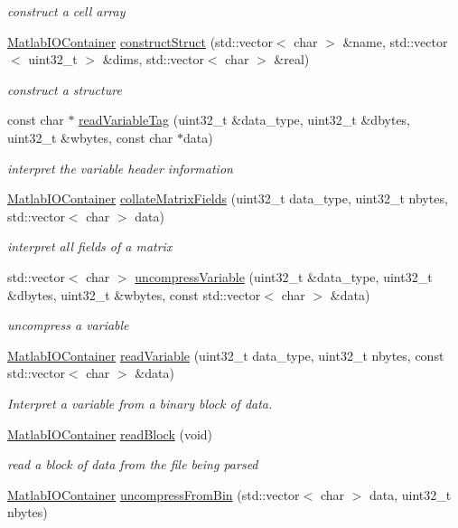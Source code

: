 \begin{DoxyCompactItemize}
\begin{DoxyCompactList}\small\item\em construct a cell array \end{DoxyCompactList}\item 
\hyperlink{classMatlabIOContainer}{Matlab\+I\+O\+Container} \hyperlink{classMatlabIO_ab5a35f3b0b204a182b7e6e0db857b8f6}{construct\+Struct} (std\+::vector$<$ char $>$ \&name, std\+::vector$<$ uint32\+\_\+t $>$ \&dims, std\+::vector$<$ char $>$ \&real)
\begin{DoxyCompactList}\small\item\em construct a structure \end{DoxyCompactList}\item 
const char $\ast$ \hyperlink{classMatlabIO_a49eeece26cd859efe5057a42a1964df5}{read\+Variable\+Tag} (uint32\+\_\+t \&data\+\_\+type, uint32\+\_\+t \&dbytes, uint32\+\_\+t \&wbytes, const char $\ast$data)
\begin{DoxyCompactList}\small\item\em interpret the variable header information \end{DoxyCompactList}\item 
\hyperlink{classMatlabIOContainer}{Matlab\+I\+O\+Container} \hyperlink{classMatlabIO_a381c9b5d7d30ae14ab62b7db18cd10ea}{collate\+Matrix\+Fields} (uint32\+\_\+t data\+\_\+type, uint32\+\_\+t nbytes, std\+::vector$<$ char $>$ data)
\begin{DoxyCompactList}\small\item\em interpret all fields of a matrix \end{DoxyCompactList}\item 
std\+::vector$<$ char $>$ \hyperlink{classMatlabIO_a40d54d0d924bfba7f50ca14ed3e728e3}{uncompress\+Variable} (uint32\+\_\+t \&data\+\_\+type, uint32\+\_\+t \&dbytes, uint32\+\_\+t \&wbytes, const std\+::vector$<$ char $>$ \&data)
\begin{DoxyCompactList}\small\item\em uncompress a variable \end{DoxyCompactList}\item 
\hyperlink{classMatlabIOContainer}{Matlab\+I\+O\+Container} \hyperlink{classMatlabIO_a0f491c5542d740b34d20d2ee4d561f73}{read\+Variable} (uint32\+\_\+t data\+\_\+type, uint32\+\_\+t nbytes, const std\+::vector$<$ char $>$ \&data)
\begin{DoxyCompactList}\small\item\em Interpret a variable from a binary block of data. \end{DoxyCompactList}\item 
\hyperlink{classMatlabIOContainer}{Matlab\+I\+O\+Container} \hyperlink{classMatlabIO_a40b79c5058418d9a2fee4706a9537bab}{read\+Block} (void)
\begin{DoxyCompactList}\small\item\em read a block of data from the file being parsed \end{DoxyCompactList}\item 
\hyperlink{classMatlabIOContainer}{Matlab\+I\+O\+Container} \hyperlink{classMatlabIO_a892a7998a32f4445dc64cd462d3f5622}{uncompress\+From\+Bin} (std\+::vector$<$ char $>$ data, uint32\+\_\+t nbytes)
\end{DoxyCompactItemize}
